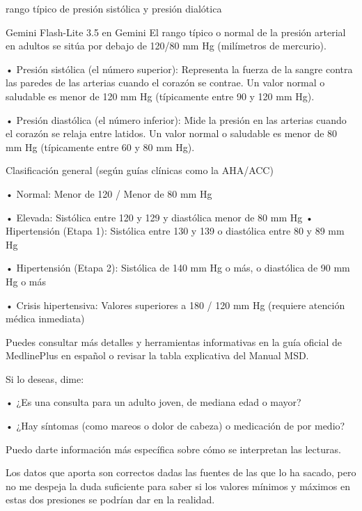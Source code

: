 \documentclass[12pt,a4paper,oneside]{book}
\begin{document}
\begin{iaprompt}
rango típico de presión sistólica y presión dialótica
\end{iaprompt}
\begin{iaresp}{Gemini Flash-Lite 3.5 en Gemini}
El rango típico o normal de la presión arterial en adultos se sitúa por debajo de 120/80 mm Hg (milímetros de mercurio).

• Presión sistólica (el número superior): Representa la fuerza de la sangre contra las paredes de las arterias cuando el corazón se contrae. Un valor normal o saludable es menor de 120 mm Hg (típicamente entre 90 y 120 mm Hg).

• Presión diastólica (el número inferior): Mide la presión en las arterias cuando el corazón se relaja entre latidos. Un valor normal o saludable es menor de 80 mm Hg (típicamente entre 60 y 80 mm Hg).

Clasificación general (según guías clínicas como la AHA/ACC)

• Normal: Menor de 120 / Menor de 80 mm Hg

• Elevada: Sistólica entre 120 y 129 y diastólica menor de 80 mm Hg
• Hipertensión (Etapa 1): Sistólica entre 130 y 139 o diastólica entre 80 y 89 mm Hg

• Hipertensión (Etapa 2): Sistólica de 140 mm Hg o más, o diastólica de 90 mm Hg o más

• Crisis hipertensiva: Valores superiores a 180 / 120 mm Hg (requiere atención médica inmediata)

Puedes consultar más detalles y herramientas informativas en la guía oficial de MedlinePlus en español o revisar la tabla explicativa del Manual MSD.

Si lo deseas, dime:

• ¿Es una consulta para un adulto joven, de mediana edad o mayor?

• ¿Hay síntomas (como mareos o dolor de cabeza) o medicación de por medio?

Puedo darte información más específica sobre cómo se interpretan las lecturas.
\end{iaresp}
\begin{iaanalisis}
Los datos que aporta son correctos dadas las fuentes de las que lo ha sacado, pero no me despeja la duda suficiente para saber si los valores mínimos y máximos en estas dos presiones se podrían dar en la realidad.
\end{iaanalisis}
\end{document}

